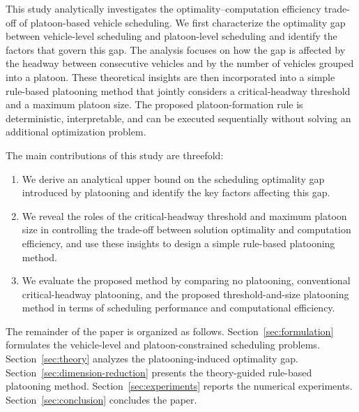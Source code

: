 This study analytically investigates the optimality--computation efficiency trade-off of platoon-based vehicle scheduling. We first characterize the optimality gap between vehicle-level scheduling and platoon-level scheduling and identify the factors that govern this gap. The analysis focuses on how the gap is affected by the headway between consecutive vehicles and by the number of vehicles grouped into a platoon. These theoretical insights are then incorporated into a simple rule-based platooning method that jointly considers a critical-headway threshold and a maximum platoon size. The proposed platoon-formation rule is deterministic, interpretable, and can be executed sequentially without solving an additional optimization problem.

The main contributions of this study are threefold:
\begin{enumerate}[label=(\roman*)]
  \item We derive an analytical upper bound on the scheduling optimality gap introduced by platooning and identify the key factors affecting this gap.
  \item We reveal the roles of the critical-headway threshold and maximum platoon size in controlling the trade-off between solution optimality and computation efficiency, and use these insights to design a simple rule-based platooning method.
  \item We evaluate the proposed method by comparing no platooning, conventional critical-headway platooning, and the proposed threshold-and-size platooning method in terms of scheduling performance and computational efficiency.
\end{enumerate}

The remainder of the paper is organized as follows. Section~\ref{sec:formulation} formulates the vehicle-level and platoon-constrained scheduling problems. Section~\ref{sec:theory} analyzes the platooning-induced optimality gap. Section~\ref{sec:dimension-reduction} presents the theory-guided rule-based platooning method. Section~\ref{sec:experiments} reports the numerical experiments. Section~\ref{sec:conclusion} concludes the paper.
